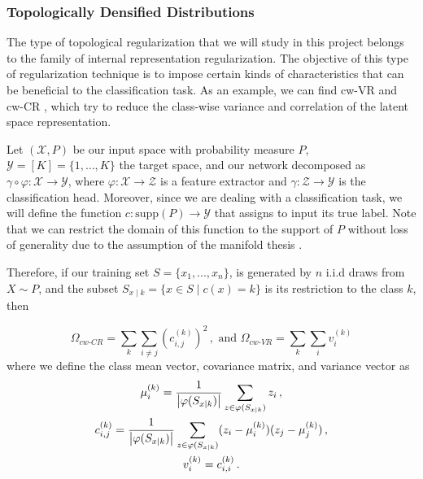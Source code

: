 \documentclass[../main.tex]{subfiles}
\begin{document}
\subsubsection*{Topologically Densified Distributions}

The type of topological regularization that we will study in this project belongs to the family of internal representation regularization. The objective of this type of regularization technique is to impose certain kinds of characteristics that can be beneficial to the classification task. As an example, we can find cw-VR and cw-CR \cite{choi_utilizing_2019}, which try to reduce the class-wise variance and correlation of the latent space representation.

Let $(\mathcal{X}, P)$ be our input space with probability measure $P$, $\mathcal{Y} = [K] =\{1, ...,K\}$ the target space, and our network decomposed as $\gamma \circ \varphi: \mathcal{X}  \to \mathcal{Y}$, where $\varphi: \mathcal{X}  \to \mathcal{Z}$ is a feature extractor and $\gamma: \mathcal{Z}  \to \mathcal{Y}$ is the classification head. Moreover, since we are dealing with a classification task, we will define the function $c: \text{supp}(P) \to \mathcal{Y}$ that assigns to input its true label. Note that we can restrict the domain of this function to the support of $P$ without loss of generality due to the assumption of the manifold thesis \cite{fefferman_testing_2016}.

Therefore, if our training set $S=\{x_1, ..., x_n\}$, is generated by $n$ i.i.d draws from $X \sim P$, and the subset $S_{x\mid k} = \{x \in S \mid c(x)=k\}$ is its restriction to the class $k$, then

\[
\Omega_{cw\text{-}CR}= \sum_{k} \sum_{i\neq j} \left(c_{i,j}^{(k)}\right)^2\,, \text{ and }
\Omega_{cw\text{-}VR}= \sum_{k} \sum_{i} v_{i}^{(k)}
\]
where we define the class mean vector, covariance matrix, and variance vector as
\begin{gather*}
\mu_i^{(k)} = \frac{1}{\left\lvert \varphi(S_{x\mid k}) \right\rvert} \sum_{z \in \varphi(S_{x\mid k})} z_i\,,\\
c_{i,j}^{(k)}= \frac{1}{\left\lvert \varphi(S_{x\mid k}) \right\rvert} \sum_{z \in \varphi(S_{x\mid k})} (z_i-\mu_i^{(k)})(z_j-\mu_j^{(k)})\,,\\
v_{i}^{(k)} =c_{i,i}^{(k)}\,.
\end{gather*}
\end{document}
